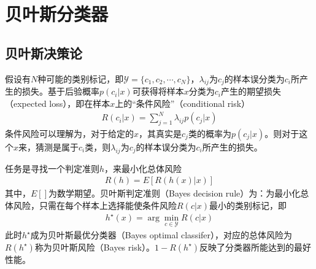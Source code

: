 \section{贝叶斯分类器}
\subsection{贝叶斯决策论}
假设有$N$种可能的类别标记，即$\mathcal{Y}=\{c_1,c_2,\cdots,c_N\}$，$\lambda_{ij}$为$c_j$的样本误分类为$c_i$所产生的损失。基于后验概率$p(c_i|x)$可获得将样本$x$分类为$c_i$产生的期望损失（expected loss），即在样本$x$上的“条件风险”（conditional risk）
\begin{eqnarray}
R(c_i|x)=\sum_{j=1}^N \lambda_{ij}p(c_j|x)
\end{eqnarray}
条件风险可以理解为，对于给定的$x$，其真实是$c_j$类的概率为$p(c_j|x)$。则对于这个$x$来，猜测是属于$c_i$类，则$\lambda_{ij}$为$c_j$的样本误分类为$c_i$所产生的损失。

任务是寻找一个判定准则$h$，来最小化总体风险
\begin{eqnarray}
R(h)=E[R(h(x)|x)]
\end{eqnarray}
其中，$E[]$为数学期望。贝叶斯判定准则（Bayes decision rule）为：为最小化总体风险，只需在每个样本上选择能使条件风险$R(c|x)$最小的类别标记，即
\begin{eqnarray}
h^\star(x)=\arg\min_{c\in\mathcal{Y}}R(c|x)
\end{eqnarray}
此时$h^\star$成为贝叶斯最优分类器（Bayes optimal classifer），对应的总体风险为$R(h^\star)$称为贝叶斯风险（Bayes risk）。$1-R(h^\star)$反映了分类器所能达到的最好性能。 

